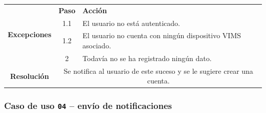 \begin{table}[H]
\begin{tabularx}{\textwidth}{|c|c|X|}
    \hline
    \multirow{4}{*}{\textbf{Excepciones}}      & \textbf{Paso}                                                                                                                                                         & \textbf{Acción}                                                                                                                                 \\
    \cline{2-3}
                                               & 1.1                                                                                                                                                                   & \multicolumn{1}{L|}{El usuario no está autenticado.}                                                                                            \\
    \cline{2-3}
                                               & 1.2                                                                                                                                                                   & \multicolumn{1}{L|}{El usuario no cuenta con ningún dispositivo \ac{VIMS} asociado.}                                                            \\
    \cline{2-3}
                                               & 2                                                                                                                                                                     & \multicolumn{1}{L|}{Todavía no se ha registrado ningún dato.}                                                                                   \\
    \hline\hline
    \textbf{Resolución}                        & \multicolumn{2}{X|}{Se notifica al usuario de este suceso y se le sugiere crear una cuenta.}                                                                                                                                                                                                                            \\
    \hline
  \end{tabularx}
\end{table}

\subsubsection{Caso de uso \texttt{04} -- envío de notificaciones}

